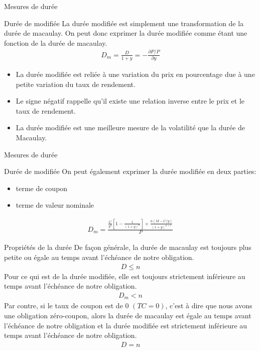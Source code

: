 \documentclass{beamer}
\begin{document}
\begin{frame}{Mesures de durée}
\begin{block}{Durée de modifiée}
La durée modifiée est simplement une transformation de la durée de macaulay. On peut donc exprimer la durée modifiée comme étant une fonction de la durée de macaulay.
\begin{align*}
D_m=\frac{D}{1+y}=-\frac{\partial P/P}{\partial y}
\end{align*}
\begin{itemize}
\item La durée modifiée est reliée à une variation du prix en pourcentage due à une petite variation du taux de rendement.  
\item Le signe négatif rappelle qu’il existe une relation inverse entre le prix et le taux de rendement.  
\item La durée modifiée est une meilleure mesure de la volatilité que la durée de Macaulay. 
\end{itemize}
\end{block}
\end{frame}



\begin{frame}{Mesures de durée}
\begin{block}{Durée de modifiée}
On peut également exprimer la durée modifiée en deux parties:
\begin{itemize}
\item terme de coupon 
\item terme de valeur nominale
\end{itemize}
\begin{align*}
D_m=\frac{\frac{C}{y^2} \left[ 1-\frac{1}{(1+y)^n} \right]+\frac{n(M-C/y)}{(1+y)^{n+1}}}{P}
\end{align*}
\end{block}
\end{frame}

\begin{frame}{Propriétés de la durée}
De façon générale,  la durée de macaulay est toujours plus petite ou égale au temps avant l'échéance de notre obligation. 
\begin{align*}
D \le n
\end{align*}
Pour ce qui est de la durée modifiée, elle est toujours strictement inférieure au temps avant l'échéance de notre obligation. 
\begin{align*}
D_m < n 
\end{align*}
Par contre, si le taux de coupon est de 0 $(TC=0)$,  c'est à dire que nous avons une obligation zéro-coupon, alors la durée de macaulay  est égale au temps avant l'échéance de notre obligation et la durée modifiée est strictement inférieure au temps avant l'échéance de notre obligation.
\begin{align*}
D=n 
\end{align*}
\end{frame}
\end{document}
